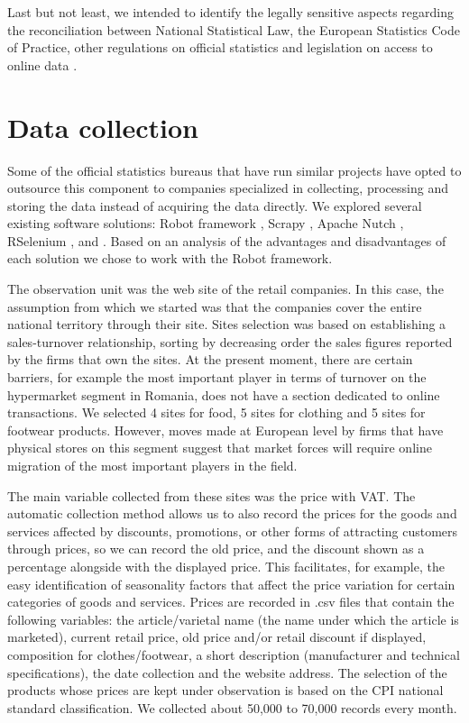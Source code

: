 \documentclass[]{article}
\begin{document}
Last but not least, we intended to identify the legally sensitive aspects regarding the reconciliation between 
National Statistical Law, the European Statistics Code of Practice, other regulations on official statistics 
and legislation on access to online data \cite{swier}.


\section{Data collection}

Some of the official statistics bureaus that have run similar projects have opted to outsource this component to companies specialized 
in collecting, processing and storing the data instead of acquiring the data directly. We explored several existing software solutions: 
Robot framework \cite{robot2018}, Scrapy \cite{scrapy1}, \cite{scrapy2} Apache Nutch \cite{nutch}, RSelenium \cite{rs1}, \cite{rs2} 
and \cite{rvest}. 
Based on an analysis of the advantages and disadvantages of each solution we chose to work with the Robot framework. 


The observation unit was the web site of the retail companies. In this case, the assumption from which we started was 
that the companies cover the entire national territory through their site. Sites selection was based on establishing a 
sales-turnover relationship, sorting by decreasing order the sales figures reported by the firms that own the sites. 
At the present moment, there are certain barriers, for example the most important player in terms of turnover on the 
hypermarket segment in Romania, does not have a section dedicated to online transactions. We selected 4 sites for food, 
5 sites for clothing and 5 sites for footwear products. However, moves made at European level by firms that have physical 
stores on this segment suggest that market forces will require online migration of the most important players in the field.

The main variable collected from these sites was the price with VAT. The automatic collection method allows us to also 
record the prices for the goods and services affected by discounts, promotions, or other forms of attracting customers
through prices, so we can record the old price, and the discount shown as a percentage alongside with the displayed price. 
This facilitates, for example, the easy identification of seasonality factors that affect the price variation for
certain categories of goods and services. Prices are recorded in .csv files that contain the following variables: 
the article/varietal name (the name under which the article is marketed), current retail price, old price and/or 
retail discount if displayed, composition for clothes/footwear, a short description (manufacturer and technical 
specifications), the date collection and the website address. The selection of the products whose prices are kept
under observation is based on the CPI national standard classification. We collected about 50,000 to 70,000 records every month.
\end{document}
